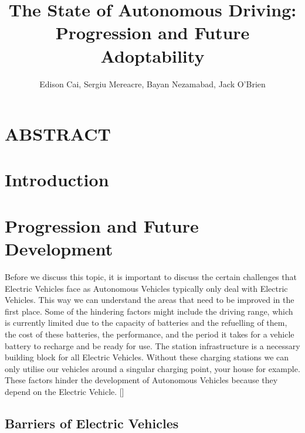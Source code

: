 \documentclass{article}
\author{Edison Cai, Sergiu Mereacre, Bayan Nezamabad, Jack O'Brien}
\title{The State of Autonomous Driving: Progression and Future Adoptability}
\begin{document}
\maketitle

\section{ABSTRACT}

\section{Introduction}

\section{Progression and Future Development}

Before we discuss this topic, it is important to discuss the certain challenges that Electric Vehicles face as Autonomous Vehicles typically only deal with Electric Vehicles. This way we can understand the areas that need to be improved in the first place. Some of the hindering factors might include the driving range, which is currently limited due to the capacity of batteries and the refuelling of them, the cost of these batteries, the performance, and the period it takes for a vehicle battery to recharge and be ready for use. The station infrastructure is a necessary building block for all Electric Vehicles. Without these charging stations we can only utilise our vehicles around a singular charging point, your house for example. These factors hinder the development of Autonomous Vehicles because they depend on the Electric Vehicle. [\textcite{bimbraw2015autonomous}]

\subsection{Barriers of Electric Vehicles}
\end{document}
